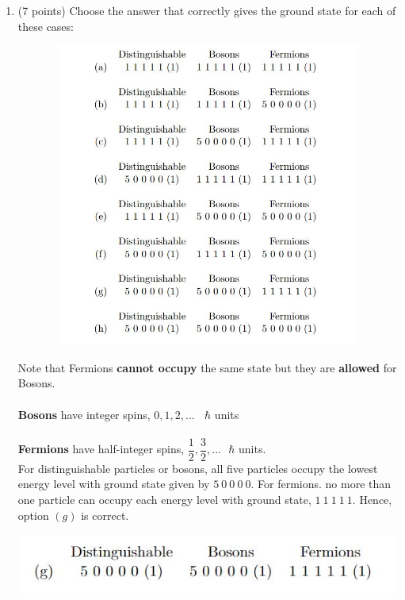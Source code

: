 \documentclass[fleqn]{article}
\begin{document}
  \begin{enumerate}
    \item (7 points) Choose the answer that correctly gives the ground state for each of these cases:
    \begin{center}
      \includegraphics[height=10cm, width=16cm]{1.JPG}
    \end{center}

      \textcolor{hwColor}{
        Note that Fermions \textbf{cannot occupy} the same state but they are
        \textbf{allowed} for Bosons.
        \\
        \\
        \textbf{Bosons} have integer spins, $0,1,2,... ~~~~ \hbar$ units
        \\
        \\
        \textbf{Fermions} have half-integer spins, $\dfrac{1}{2}, \dfrac{3}{2},... ~~~ \hbar$ units.
        \\
        For distinguishable particles or bosons, all five particles occupy the lowest 
        energy level with ground state given by $5 ~ 0 ~ 0 ~ 0 ~ 0$. For fermions. no more than 
        one particle can occupy each energy level with ground state, $1 ~ 1 ~ 1 ~ 1 ~ 1$. Hence, option 
        $(g)$ is correct.
      }
      \begin{center}
        \includegraphics[height=2cm, width=14cm]{Answer1.JPG}
      \end{center}


\end{enumerate}
\end{document}
